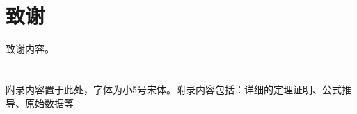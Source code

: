 \documentclass{cjc}
\begin{document}



\section*{致谢}

致谢内容。


\nocite{*}






\appendix

\section{}

附录内容置于此处，字体为小5号宋体。附录内容包括：详细的定理证明、公式推导、原始数据等










\end{document}
